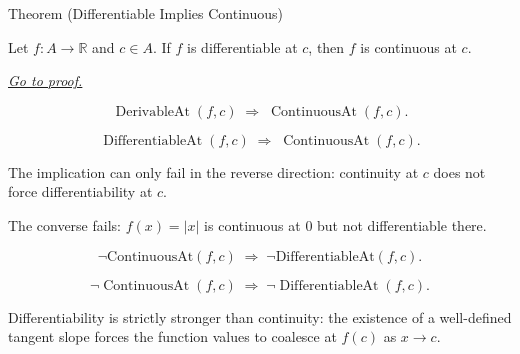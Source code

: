 \begin{theorembox}{Theorem (Differentiable Implies Continuous)}
\begin{theorem}
\label{thm:differentiable-implies-continuous}
Let $f : A \to \mathbb{R}$ and $c \in A$. If $f$ is differentiable at $c$, then $f$ is continuous at $c$.

\smallskip\noindent
\hyperref[prf:differentiable-implies-continuous]{\textit{Go to proof.}}
\end{theorem}
\end{theorembox}

\begin{remark*}
\[
\operatorname{DerivableAt}(f,c) \;\Rightarrow\; \operatorname{ContinuousAt}(f,c).
\]
\end{remark*}

\begin{remark*}
\[
\operatorname{DifferentiableAt}(f,c)
\;\Longrightarrow\;
\operatorname{ContinuousAt}(f,c).
\]
\end{remark*}

\begin{remark*}
The implication can only fail in the reverse direction: continuity at $c$
does not force differentiability at $c$.
\end{remark*}

\begin{remark*}
The converse fails: $f(x) = |x|$ is continuous at $0$ but not differentiable there.
\end{remark*}

\begin{remark*}
\[
\neg \text{ContinuousAt}(f,c) \;\Rightarrow\; \neg \text{DifferentiableAt}(f,c).
\]
\end{remark*}

\begin{remark*}
\[
\neg\operatorname{ContinuousAt}(f,c)
\;\Longrightarrow\;
\neg\operatorname{DifferentiableAt}(f,c).
\]
\end{remark*}

\begin{remark*}[Interpretation]
Differentiability is strictly stronger than continuity: the existence of a well-defined tangent slope forces the function values to coalesce at $f(c)$ as $x \to c$.
\end{remark*}

